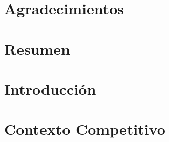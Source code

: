 \documentclass[a4paper, 11pt, oneside]{memoir}
\title{\izenburua}
\author{\egilea}
\date{\data}
\begin{document}

% 


\cleardoublepage
\frontmatter


\chapter*{Agradecimientos}

\cleardoublepage


\chapter*{Resumen}

\cleardoublepage



\cleardoublepage


\tableofcontents
\clearpage
\listoffigures
\clearpage
\listoftables
\clearpage
\listofalgorithms
{}


\cleardoublepage
\mainmatter
\pagestyle{ruled}

% 

\chapter{Introducción} \label{ch:introduccion}

\cleardoublepage

\chapter{Contexto Competitivo} \label{ch:contextoCompetitivo}

\cleardoublepage
\end{document}
